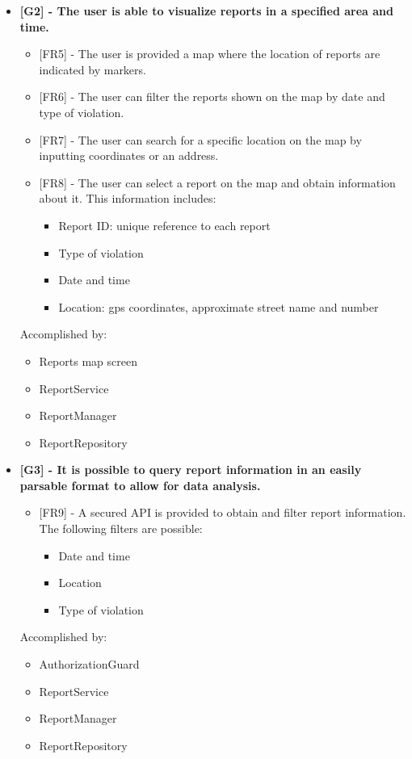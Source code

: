 \begin{itemize}[label={}]
    \item \textbf{[G2] - The user is able to visualize reports in a specified area and time.}
        \begin{itemize}[label={}]
            \item {[FR5]} - The user is provided a map where the location of reports are indicated by markers.
            \item {[FR6]} - The user can filter the reports shown on the map by date and type of violation.
            \item {[FR7]} - The user can search for a specific location on the map by inputting coordinates or an address.
            \item {[FR8]} - The user can select a report on the map and obtain information about it. This information includes:
            \begin{itemize}[label={\textbullet}]
                \item Report ID: unique reference to each report
                \item Type of violation
                \item Date and time
                \item Location: gps coordinates, approximate street name and number
            \end{itemize}
        \end{itemize}
        Accomplished by:
        \begin{itemize}[label={\textbullet}]
            \item Reports map screen
            \item ReportService
            \item ReportManager
            \item ReportRepository
        \end{itemize}

    \item \textbf{[G3] - It is possible to query report information in an easily parsable format to allow for data analysis.}
        \begin{itemize}[label={}]
            \item {[FR9]} - A secured API is provided to obtain and filter report information. The following filters are possible:
            \begin{itemize}[label={\textbullet}]
                \item Date and time
                \item Location
                \item Type of violation
            \end{itemize}
        \end{itemize}
        Accomplished by:
        \begin{itemize}[label={\textbullet}]
            \item AuthorizationGuard
            \item ReportService
            \item ReportManager
            \item ReportRepository
        \end{itemize}


\end{itemize}
